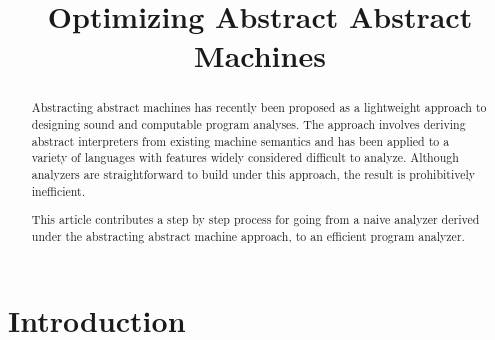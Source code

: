 \documentclass[preprint,onecolumn,9pt]{sigplanconf} %
\begin{document}
\copyrightdata{[to be supplied]}


\title{Optimizing Abstract Abstract Machines}

\authorinfo{}{}{}

\maketitle

\begin{abstract}
Abstracting abstract machines has recently been proposed as a
lightweight approach to designing sound and computable program
analyses.  The approach involves deriving abstract interpreters from
existing machine semantics and has been applied to a variety of
languages with features widely considered difficult to analyze.
Although analyzers are straightforward to build under this approach,
the result is prohibitively inefficient.

This article contributes a step by step process for going from a naive
analyzer derived under the abstracting abstract machine approach, to
an efficient program analyzer.
\end{abstract}




\section{Introduction}
\end{document}
